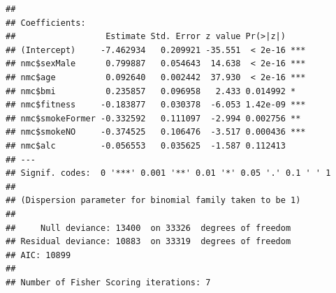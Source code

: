 \documentclass{article}\usepackage[]{graphicx}\usepackage[]{xcolor}
\makeatletter
\newenvironment{kframe}{%
 \def\at@end@of@kframe{}%
 \ifinner\ifhmode%
  \def\at@end@of@kframe{\end{minipage}}%
  \begin{minipage}{\columnwidth}%
 \fi\fi%
 \def\FrameCommand##1{\hskip\@totalleftmargin \hskip-\fboxsep
 \colorbox{shadecolor}{##1}\hskip-\fboxsep
     \hskip-\linewidth \hskip-\@totalleftmargin \hskip\columnwidth}%
 \MakeFramed {\advance\hsize-\width
   \@totalleftmargin\z@ \linewidth\hsize
   \@setminipage}}%
 {\par\unskip\endMakeFramed%
 \at@end@of@kframe}
\newenvironment{knitrout}{}{} %
\makeatother
\begin{document}
\begin{knitrout}
\begin{kframe}
\begin{verbatim}
## 
## Coefficients:
##                  Estimate Std. Error z value Pr(>|z|)    
## (Intercept)     -7.462934   0.209921 -35.551  < 2e-16 ***
## nmc$sexMale      0.799887   0.054643  14.638  < 2e-16 ***
## nmc$age          0.092640   0.002442  37.930  < 2e-16 ***
## nmc$bmi          0.235857   0.096958   2.433 0.014992 *  
## nmc$fitness     -0.183877   0.030378  -6.053 1.42e-09 ***
## nmc$smokeFormer -0.332592   0.111097  -2.994 0.002756 ** 
## nmc$smokeNO     -0.374525   0.106476  -3.517 0.000436 ***
## nmc$alc         -0.056553   0.035625  -1.587 0.112413    
## ---
## Signif. codes:  0 '***' 0.001 '**' 0.01 '*' 0.05 '.' 0.1 ' ' 1
## 
## (Dispersion parameter for binomial family taken to be 1)
## 
##     Null deviance: 13400  on 33326  degrees of freedom
## Residual deviance: 10883  on 33319  degrees of freedom
## AIC: 10899
## 
## Number of Fisher Scoring iterations: 7
\end{verbatim}
\end{kframe}
\end{knitrout}
          
\end{document}
